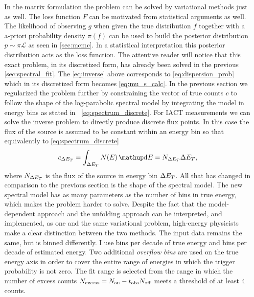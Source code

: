 In the matrix formulation the problem can be solved by variational methods just as well. The loss function $F$ can be motivated from 
statistical arguments as well. 
The likelihood of observing $g$ when given the true distribution $f$ together with a a-priori probability density $\pi(f)$ can be 
used to build the posterior distribution $p \sim \pi \mathcal{L}$ as seen in \cref{sec:mcmc}. 
In a statistical interpretation this posterior distribution acts as the loss function. 
The attentive reader will notice that this exact problem, in its discretized form, has already been solved in the previous \cref{sec:spectral_fit}. 
The \cref{eq:inverse} above corresponds 
to \cref{eq:dispersion_prob} which in its discretized form becomes \cref{eq:mu_s_calc}. In the previous section we regularized the problem 
further by constraining the vector of true counts $c$ to follow the shape of the log-parabolic spectral model by integrating the model in energy bins
as stated in ~\cref{eq:spectrum_discrete}. 
For IACT measurements we can solve the inverse problem to directly produce discrete flux points. 
In this case the flux of the source is assumed to be constant within an energy bin so that equivalently to \cref{eq:spectrum_discrete}
\begin{equation*}
  c_{\Delta \etrue} = \int_{\Delta \etrue} N(E) \diff{E} = N_{\Delta \etrue} \Delta \etrue,
\end{equation*}
where $N_{\Delta E_T}$ is the flux of the source in energy bin $\Delta E_T$.
All that has changed in comparison to the previous section is the shape of the spectral model. The new spectral model has as many parameters as 
the number of bins in true energy, which makes the problem harder to solve.
Despite the fact that the model-dependent approach and the unfolding approach can be interpreted, and implemented, as one and the same variational problem,
high-energy physicists make a clear distinction between the two methods. 
The input data remains the same, but is binned differently. I use  bins per decade of true 
energy and  bins per decade of estimated energy.
Two additional \emph{overflow bins} are used on the true energy axis in order to cover the entire range of energies in which the 
trigger probability is not zero. 
The fit range is selected from the range in which the number of excess counts $N_\text{excess} = N_\text{on} - t_{\text{obs}} N_\text{off}$
meets a threshold of at least \num{4} counts.
